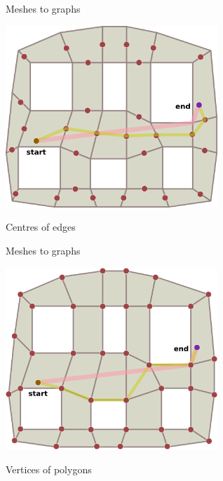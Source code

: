 \begin{frame}{Meshes to graphs}
	\begin{center}
		\includegraphics[width=0.6\textwidth]{polygon-navmesh-edges}
		
		Centres of edges
	\end{center}
\end{frame}

\begin{frame}{Meshes to graphs}
	\begin{center}
		\includegraphics[width=0.6\textwidth]{polygon-navmesh-vertices}
		
		Vertices of polygons
	\end{center}
\end{frame}

